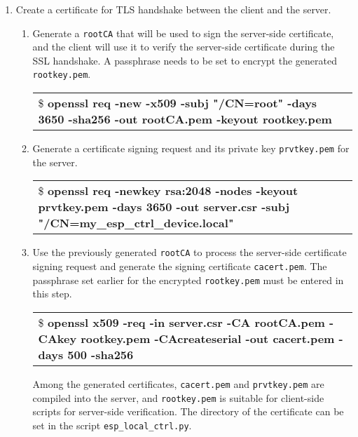 \documentclass[a4paper,12pt]{book}
\begin{document}
\begin{enumerate}[label=\arabic*.,leftmargin=1.5em]
    \item Create a certificate for TLS handshake between the client and the server.

    \begin{enumerate}[leftmargin=0em,label=\alph*.]
        \item Generate a \verb|rootCA| that will be used to sign the server-side certificate, and the client will use it to verify the server-side certificate during the SSL handshake. A passphrase needs to be set to encrypt the generated \verb|rootkey.pem|.

        \begin{codebloc}
        \begin{tabular}{a}
\$ \textbf{openssl req -new -x509 -subj "/CN=root" -days 3650 -sha256 -out rootCA.pem -keyout rootkey.pem}
        \end{tabular}
        \end{codebloc}

        \item Generate a certificate signing request and its private key \verb|prvtkey.pem| for the server.

        \begin{codebloc}
        \begin{tabular}{a}
\$ \textbf{openssl req -newkey rsa:2048 -nodes -keyout prvtkey.pem -days 3650 -out server.csr -subj "/CN=my\_esp\_ctrl\_device.local"}
        \end{tabular}
        \end{codebloc}

        \item Use the previously generated \verb|rootCA| to process the server-side certificate signing request and generate the signing certificate \verb|cacert.pem|. The passphrase set earlier for the encrypted \verb|rootkey.pem| must be entered in this step.

        \begin{codebloc}
        \begin{tabular}{a}
\$ \textbf{openssl x509 -req -in server.csr -CA rootCA.pem -CAkey rootkey.pem -CAcreateserial -out cacert.pem -days 500 -sha256}
        \end{tabular}
        \end{codebloc}

        Among the generated certificates, \verb|cacert.pem| and \verb|prvtkey.pem| are compiled into the server, and \verb|rootkey.pem| is suitable for client-side scripts for server-side verification. The directory of the certificate can be set in the script \verb|esp_local_ctrl.py|.


\end{enumerate}
\end{enumerate}
\end{document}
